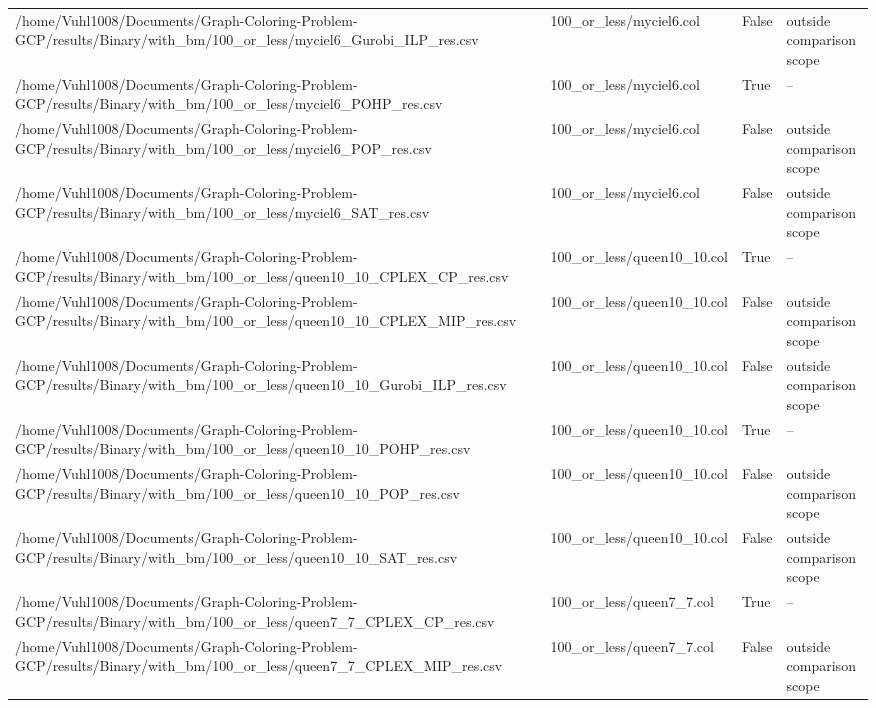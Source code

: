 \begin{table}[htbp]
\begin{tabular}{llll}
/home/Vuhl1008/Documents/Graph-Coloring-Problem-GCP/results/Binary/with\_bm/100\_or\_less/myciel6\_Gurobi\_ILP\_res.csv & 100\_or\_less/myciel6.col & False & outside comparison scope \\
/home/Vuhl1008/Documents/Graph-Coloring-Problem-GCP/results/Binary/with\_bm/100\_or\_less/myciel6\_POHP\_res.csv & 100\_or\_less/myciel6.col & True & -- \\
/home/Vuhl1008/Documents/Graph-Coloring-Problem-GCP/results/Binary/with\_bm/100\_or\_less/myciel6\_POP\_res.csv & 100\_or\_less/myciel6.col & False & outside comparison scope \\
/home/Vuhl1008/Documents/Graph-Coloring-Problem-GCP/results/Binary/with\_bm/100\_or\_less/myciel6\_SAT\_res.csv & 100\_or\_less/myciel6.col & False & outside comparison scope \\
/home/Vuhl1008/Documents/Graph-Coloring-Problem-GCP/results/Binary/with\_bm/100\_or\_less/queen10\_10\_CPLEX\_CP\_res.csv & 100\_or\_less/queen10\_10.col & True & -- \\
/home/Vuhl1008/Documents/Graph-Coloring-Problem-GCP/results/Binary/with\_bm/100\_or\_less/queen10\_10\_CPLEX\_MIP\_res.csv & 100\_or\_less/queen10\_10.col & False & outside comparison scope \\
/home/Vuhl1008/Documents/Graph-Coloring-Problem-GCP/results/Binary/with\_bm/100\_or\_less/queen10\_10\_Gurobi\_ILP\_res.csv & 100\_or\_less/queen10\_10.col & False & outside comparison scope \\
/home/Vuhl1008/Documents/Graph-Coloring-Problem-GCP/results/Binary/with\_bm/100\_or\_less/queen10\_10\_POHP\_res.csv & 100\_or\_less/queen10\_10.col & True & -- \\
/home/Vuhl1008/Documents/Graph-Coloring-Problem-GCP/results/Binary/with\_bm/100\_or\_less/queen10\_10\_POP\_res.csv & 100\_or\_less/queen10\_10.col & False & outside comparison scope \\
/home/Vuhl1008/Documents/Graph-Coloring-Problem-GCP/results/Binary/with\_bm/100\_or\_less/queen10\_10\_SAT\_res.csv & 100\_or\_less/queen10\_10.col & False & outside comparison scope \\
/home/Vuhl1008/Documents/Graph-Coloring-Problem-GCP/results/Binary/with\_bm/100\_or\_less/queen7\_7\_CPLEX\_CP\_res.csv & 100\_or\_less/queen7\_7.col & True & -- \\
/home/Vuhl1008/Documents/Graph-Coloring-Problem-GCP/results/Binary/with\_bm/100\_or\_less/queen7\_7\_CPLEX\_MIP\_res.csv & 100\_or\_less/queen7\_7.col & False & outside comparison scope \\

\end{tabular}
\end{table}
